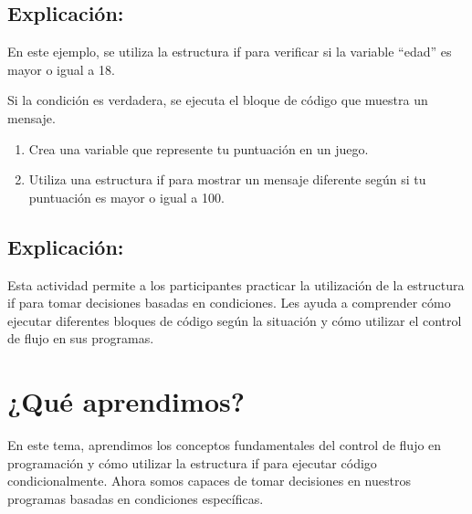\documentclass[
  a4paper,
  DIV=11,
  numbers=noendperiod,
  onepage,
  openany]{scrreprt}
\providecommand{\tightlist}{%
  \setlength{\itemsep}{0pt}\setlength{\parskip}{0pt}}\usepackage{longtable,booktabs,array}
\begin{document}
\subsection{Explicación:}\label{explicaciuxf3n-16}

En este ejemplo, se utiliza la estructura if para verificar si la
variable ``edad'' es mayor o igual a 18.

Si la condición es verdadera, se ejecuta el bloque de código que muestra
un mensaje.

\begin{tcolorbox}[enhanced jigsaw, breakable, bottomrule=.15mm, rightrule=.15mm, colbacktitle=quarto-callout-tip-color!10!white, toprule=.15mm, title=\textcolor{quarto-callout-tip-color}{\faLightbulb}\hspace{0.5em}{Actividad Práctica}, opacitybacktitle=0.6, toptitle=1mm, coltitle=black, left=2mm, arc=.35mm, titlerule=0mm, colback=white, bottomtitle=1mm, opacityback=0, leftrule=.75mm, colframe=quarto-callout-tip-color-frame]

\begin{enumerate}
\def\labelenumi{\arabic{enumi}.}
\tightlist
\item
  Crea una variable que represente tu puntuación en un juego.
\item
  Utiliza una estructura if para mostrar un mensaje diferente según si
  tu puntuación es mayor o igual a 100.
\end{enumerate}

\end{tcolorbox}

\subsection{Explicación:}\label{explicaciuxf3n-17}

Esta actividad permite a los participantes practicar la utilización de
la estructura if para tomar decisiones basadas en condiciones. Les ayuda
a comprender cómo ejecutar diferentes bloques de código según la
situación y cómo utilizar el control de flujo en sus programas.

\section{¿Qué aprendimos?}\label{quuxe9-aprendimos-3}

En este tema, aprendimos los conceptos fundamentales del control de
flujo en programación y cómo utilizar la estructura if para ejecutar
código condicionalmente. Ahora somos capaces de tomar decisiones en
nuestros programas basadas en condiciones específicas.
\end{document}
